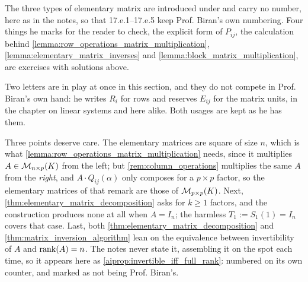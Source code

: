 \begin{ainote}
The three types of elementary matrix are introduced under  and
carry no number, here as in the notes, so that 17.e.1--17.e.5 keep Prof. Biran's
own numbering. Four things he marks for the reader to check, the explicit form
of $P_{ij}$, the calculation behind
\cref{lemma:row_operations_matrix_multiplication},
\cref{lemma:elementary_matrix_inverses} and
\cref{lemma:block_matrix_multiplication}, are exercises with solutions above.

Two letters are in play at once in this section, and they do not compete in
Prof. Biran's own hand: he writes $R_i$ for rows and reserves $E_{ij}$ for the
matrix units, in the chapter on linear systems and here alike. Both usages are
kept as he has them.

Three points deserve care. The elementary matrices are square of size $n$, which
is what \cref{lemma:row_operations_matrix_multiplication} needs, since it
multiplies $A \in \mathcal{M}_{n \times p}(K)$ from the left; but
\cref{rem:column_operations} multiplies the same $A$ from the \emph{right}, and
$A \cdot Q_{ij}(\alpha)$ only composes for a $p \times p$ factor, so the
elementary matrices of that remark are those of $\mathcal{M}_{p \times p}(K)$. Next,
\cref{thm:elementary_matrix_decomposition} asks for $k \ge 1$ factors, and the
construction produces none at all when $A = I_n$; the harmless
$T_1 := S_1(1) = I_n$ covers that case. Last, both
\cref{thm:elementary_matrix_decomposition} and
\cref{thm:matrix_inversion_algorithm} lean on the equivalence between
invertibility of $A$ and $\operatorname{rank}(A) = n$. The notes never state it, assembling it
on the spot each time, so it appears here as
\cref{aiprop:invertible_iff_full_rank}: numbered on its own counter, and marked
as not being Prof. Biran's.
\end{ainote}


